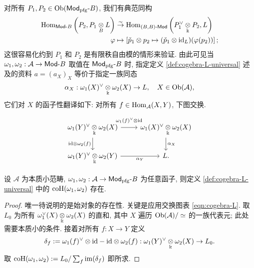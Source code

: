 对所有 $P_1, P_2 \in \operatorname{Ob}(\mathsf{Mod}_{\mathrm{pfg}}\text{-}B)$, 我们有典范同构
\begin{equation*}\begin{aligned}
	\operatorname{Hom}_{\mathsf{Mod}\text{-}B}\left( P_2, P_1 \underset{B}{\otimes} L \right) & \stackrel{\sim}{\rightarrow} \operatorname{Hom}_{(B, B)\text{-}\mathsf{Mod}}\left( P_1^\vee \underset{\Bbbk}{\otimes} P_2, L \right) \\
	\varphi & \mapsto \left[ \check{p}_1 \otimes p_2 \mapsto (\check{p}_1 \otimes \mathrm{id}_L)(\varphi(p_2)) \right] ;
\end{aligned}\end{equation*}
这很容易化约到 $P_1$ 和 $P_2$ 是有限秩自由模的情形来验证. 由此可见当 $\omega_1, \omega_2: \mathcal{A} \to \mathsf{Mod}\text{-}B$ 取值在 $\mathsf{Mod}_{\mathrm{pfg}}\text{-}B$ 时, 指定定义 \ref{def:cogebra-L-universal} 述及的资料 $a = (a_X)_X$ 等价于指定一族同态
\[ \alpha_X: \omega_1(X)^\vee \underset{\Bbbk}{\otimes} \omega_2(X) \to L, \quad X \in \operatorname{Ob}(\mathcal{A}), \]
它们对 $X$ 的函子性翻译如下: 对所有 $f \in \operatorname{Hom}_{\mathcal{A}}(X, Y)$, 下图交换.
\begin{equation}\label{eqn:cogebra-L}\begin{tikzcd}
	\omega_1(Y)^\vee \dotimes{\Bbbk} \omega_2(X) \arrow[r, "{\omega_1(f)^\vee \otimes \identity}" inner sep=0.6em] \arrow[d, "{\identity \otimes \omega_2(f)}"'] & \omega_1(X)^\vee \dotimes{\Bbbk} \omega_2(X) \arrow[d, "{\alpha_X}"] \\
	\omega_1(Y)^\vee \dotimes{\Bbbk} \omega_2(Y) \arrow[r, "{\alpha_Y}"'] & L.
\end{tikzcd}\end{equation}

\begin{proposition}\label{prop:cogebra-L-universal}
	设 $\mathcal{A}$ 为本质小范畴, $\omega_1, \omega_2: \mathcal{A} \to \mathsf{Mod}_{\mathrm{pfg}}\text{-}B$ 为任意函子, 则定义 \ref{def:cogebra-L-universal} 中的 $\operatorname{coH}(\omega_1, \omega_2)$ 存在.
\end{proposition}
\begin{proof}
	唯一待说明的是始对象的存在性. 关键是应用交换图表 \eqref{eqn:cogebra-L}. 取 $L_0$ 为所有 $\omega_1^\vee(X) \underset{\Bbbk}{\otimes} \omega_2(X)$ 的直和, 其中 $X$ 遍历 $\operatorname{Ob}(\mathcal{A})/\simeq$ 的一族代表元; 此处需要本质小的条件. 接着对所有 $f: X \to Y$ 定义
	\[ \delta_f := \omega_1(f)^\vee \otimes \mathrm{id} - \mathrm{id} \otimes \omega_2(f) : \omega_1(Y)^\vee \underset{\Bbbk}{\otimes} \omega_2(X) \to L_0. \]
	取 $\operatorname{coH}(\omega_1, \omega_2) := L_0 / \sum_f \operatorname{im}(\delta_f)$ 即所求.
\end{proof}


